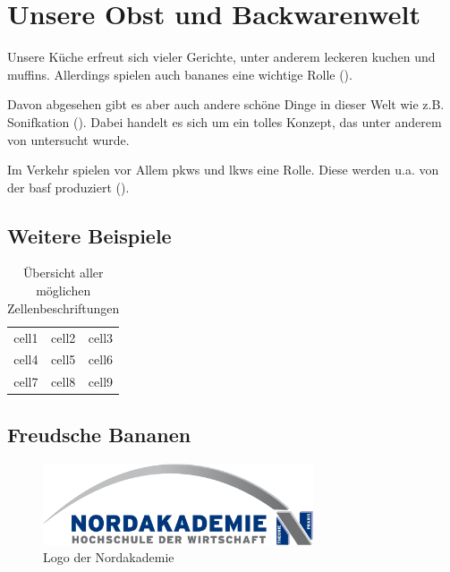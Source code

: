 \section{Unsere Obst und Backwarenwelt}
\label{sec:ObstUndBackwaren}

Unsere Küche erfreut sich vieler Gerichte, unter anderem leckeren \Gls{kuchen} und \Glspl{muffin}. Allerdings spielen auch \Glspl{banane} eine wichtige Rolle (\cite{halimSonificationNovelApproach2006}).

Davon abgesehen gibt es aber auch andere schöne Dinge in dieser Welt wie z.B. Sonifkation (\cite{hermannListenYourData1999}). Dabei handelt es sich um ein tolles Konzept, das unter anderem von \citeauthor{hermannSonificationHandbook2011a} untersucht wurde.

Im Verkehr spielen vor Allem \Glspl{pkw} und \Glspl{lkw} eine Rolle. Diese werden u.a. von der \Gls{basf} produziert (\cite{erdmannSonifikationBildern}).

\subsection{Weitere Beispiele}
\blindtext

\begin{table}[ht]
    \begin{tabular}{ c c c }
        cell1 & cell2 & cell3 \\ 
        cell4 & cell5 & cell6 \\  
        cell7 & cell8 & cell9 \\
    \end{tabular}
    \caption{Übersicht aller möglichen Zellenbeschriftungen}
\end{table}

\subsection{Freudsche Bananen}
\blindtext

\begin{figure}[ht]
    \includegraphics[width=8cm]{dokumente/bilder/Nordakademie_Logo_gross.jpg}
    \centering
    \caption{Logo der Nordakademie}
\end{figure}

\blindtext